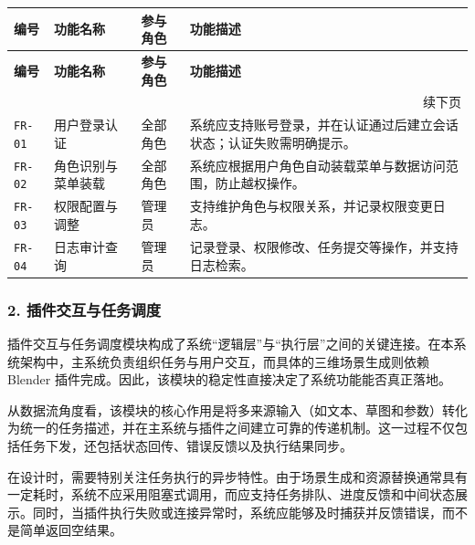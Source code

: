 \documentclass[UTF8,a4paper,10pt]{ctexart}
\begin{document}
{
\renewcommand{\arraystretch}{1.35}

\begin{longtable}{p{1.8cm} p{2.6cm} p{2.2cm} p{6.2cm}}
\toprule
\rowcolor{gray!20}
\textbf{编号} & \textbf{功能名称} & \textbf{参与角色} & \textbf{功能描述} \\
\midrule
\endfirsthead

\toprule
\rowcolor{gray!20}
\textbf{编号} & \textbf{功能名称} & \textbf{参与角色} & \textbf{功能描述} \\
\midrule
\endhead

\midrule
\multicolumn{4}{r}{\small 续下页}\\
\endfoot

\bottomrule
\endlastfoot

\texttt{FR-01} & 用户登录认证 & 全部角色 & 系统应支持账号登录，并在认证通过后建立会话状态；认证失败需明确提示。 \\
\texttt{FR-02} & 角色识别与菜单装载 & 全部角色 & 系统应根据用户角色自动装载菜单与数据访问范围，防止越权操作。 \\
\texttt{FR-03} & 权限配置与调整 & 管理员 & 支持维护角色与权限关系，并记录权限变更日志。 \\
\texttt{FR-04} & 日志审计查询 & 管理员 & 记录登录、权限修改、任务提交等操作，并支持日志检索。 \\

\end{longtable}
}

\subsubsection*{2. 插件交互与任务调度}
插件交互与任务调度模块构成了系统“逻辑层”与“执行层”之间的关键连接。在本系统架构中，主系统负责组织任务与用户交互，而具体的三维场景生成则依赖 Blender 插件完成。因此，该模块的稳定性直接决定了系统功能能否真正落地。

从数据流角度看，该模块的核心作用是将多来源输入（如文本、草图和参数）转化为统一的任务描述，并在主系统与插件之间建立可靠的传递机制。这一过程不仅包括任务下发，还包括状态回传、错误反馈以及执行结果同步。

在设计时，需要特别关注任务执行的异步特性。由于场景生成和资源替换通常具有一定耗时，系统不应采用阻塞式调用，而应支持任务排队、进度反馈和中间状态展示。同时，当插件执行失败或连接异常时，系统应能够及时捕获并反馈错误，而不是简单返回空结果。
\end{document}
